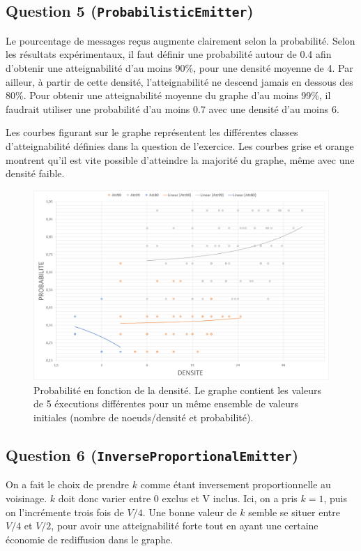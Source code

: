 \documentclass[a4paper]{article}
\begin{document}
\pagebreak

\subsection{Question 5 (\texttt{ProbabilisticEmitter})}

Le pourcentage de messages reçus augmente clairement selon la
probabilité. Selon les résultats expérimentaux, il faut définir une probabilité autour
de 0.4 afin d'obtenir une atteignabilité d'au moins 90\%, pour une
densité moyenne de 4. Par ailleur, à partir de cette densité, l'atteignabilité ne descend jamais
en dessous des 80\%. Pour obtenir une atteignabilité moyenne du graphe
d'au moins 99\%, il faudrait utiliser une probabilité d'au moins 0.7
avec une densité d'au moins 6.

Les courbes figurant sur le graphe représentent les différentes
classes d'atteignabilité définies dans la question de l'exercice. Les
courbes grise et orange montrent qu'il est vite possible d'atteindre la
majorité du graphe, même avec une densité faible.

\begin{figure}[H]
\begin{minipage}{\textwidth}
  \centering
    \includegraphics[width=\textwidth]{images/ex2q5-log-trendlines.png}
    \caption{Probabilité en fonction de la densité. Le graphe contient
    les valeurs de 5 éxecutions différentes pour un même ensemble de
    valeurs initiales (nombre de noeuds/densité et probabilité).}
\end{minipage}
\end{figure}

\pagebreak

\subsection{Question 6 (\texttt{InverseProportionalEmitter})}
On a fait le choix de prendre $k$ comme étant inversement
proportionnelle au voisinage. $k$ doit donc varier entre 0 exclus et
V inclus. Ici, on a pris $k = 1$, puis on l'incrémente trois fois de
$V/4$. Une bonne valeur de $k$ semble se situer entre $V/4$ et $V/2$,
pour avoir une atteignabilité forte tout en ayant une certaine
économie de rediffusion dans le graphe.
\end{document}
